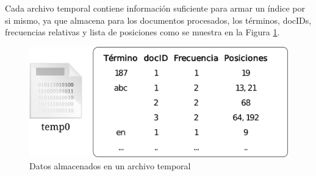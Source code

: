 Cada archivo temporal contiene información suficiente para armar un índice por si mismo, ya que almacena para los documentos procesados, los términos, docIDs, frecuencias relativas y lista de posiciones como se muestra en la Figura \ref{fig:tempfile}.


\begin{figure}[!h]
\centering
    \includegraphics[scale=0.9]{./Images/tempFileEstr.png}
\caption{Datos almacenados en un archivo temporal}
\label{fig:tempfile}
\end{figure}


